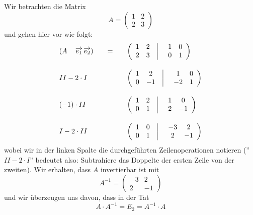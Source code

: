 \begin{beispiel} Wir betrachten die Matrix
  	$$ A = \left(\begin{matrix} 1 & 2 \\ 2 & 3 \end{matrix} \right) $$
und gehen hier vor wie folgt:
  	$$ \begin{array} {l c l}
     	\left( A \quad \, \overrightarrow{e_1} \, \overrightarrow{e_2}\right) & \quad = \quad & 
     	\left( \begin{array} {c c | c c} 1 & 2 \phantom{x} &  \quad 1 & 0 \\ 
	2 & 3 \phantom{x} &  \quad  0 & 1 \end{array} \right)  \\[2.0em]
     	II - 2 \cdot I  & & \left( \begin{array} {c c | c c} 1 &  2 \phantom{x} &  \quad  1 & 0 \\ 
	0 & -1 \phantom{x} &  \quad  -2 & 1 \end{array} \right)  \\[2.0em]
    	(-1) \cdot II & & \left( \begin{array} {c c | c c} 1 &  2 \phantom{x} &  \quad  1 & 0 \\ 
	0 &  1 \phantom{x} &  \quad   2 & -1 \end{array} \right)  \\[2.0em]
     	I - 2 \cdot II & & \left(\begin{array} {c c | c c} 1 &  0 \phantom{x} &  \quad  -3 & 2 \\ 
	0 &  1 \phantom{x} &  \quad   2 & -1 \end{array} \right) 
   	\end{array} $$
wobei wir in der linken Spalte die durchgeführten Zeilenoperationen notieren (''$II - 2 \cdot I$'' bedeutet 
also: Subtrahiere das Doppelte der ersten Zeile von der zweiten). Wir erhalten, dass $A$ invertierbar ist mit
  	$$ A^{-1} = \left(\begin{matrix} -3 & 2 \\ 2 & -1 \end{matrix} \right) $$
und wir überzeugen uns davon, dass in der Tat
  	$$ A \cdot A^{-1} = E_2 = A^{-1} \cdot A $$
\end{beispiel}


